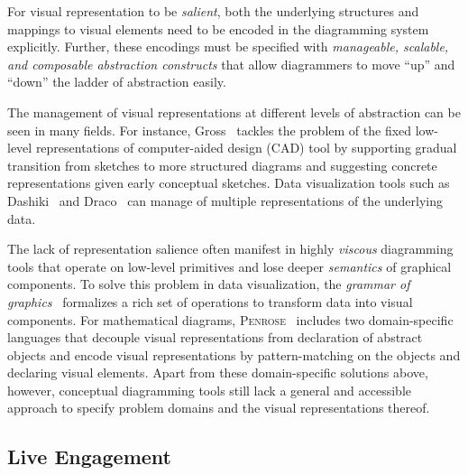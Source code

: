 For visual representation to be \emph{salient}, both the underlying structures and mappings to visual elements need to be encoded in the diagramming system explicitly. Further, these encodings must be specified with \emph{manageable, scalable, and composable abstraction constructs} that allow diagrammers to move ``up'' and ``down'' the ladder of abstraction easily.

The management of visual representations at different levels of abstraction can be seen in many fields. For instance, Gross \cite{cocktailNapkins}~tackles the problem of the fixed low-level representations of computer-aided design (CAD) tool by supporting gradual transition from sketches to more structured diagrams and suggesting concrete representations given early conceptual sketches. Data visualization tools such as Dashiki~\cite{dashiki} and Draco~\cite{Draco} can manage of multiple representations of the underlying data. 

The lack of representation salience often manifest in highly \emph{viscous} diagramming tools that operate on low-level primitives and lose deeper \emph{semantics} of graphical components. To solve this problem in data visualization, the \emph{grammar of graphics}~\cite{wilkinson_grammar_2012} formalizes a rich set of operations to transform data into visual components. For mathematical diagrams, \textsc{Penrose}~\cite{DSLDI} includes two domain-specific languages that decouple visual representations from declaration of abstract objects and encode visual representations by pattern-matching on the objects and declaring visual elements. Apart from these domain-specific solutions above, however, conceptual diagramming tools still lack a general and accessible approach to specify problem domains and the visual representations thereof. 

\subsection{Live Engagement}

